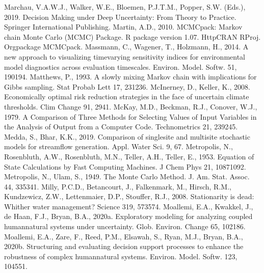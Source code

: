 \documentclass[letterpaper,10pt,english]{sphinxmanual}
\begin{document}
Marchau, V.A.W.J., Walker, W.E., Bloemen, P.J.T.M., Popper, S.W. (Eds.), 2019. Decision Making under Deep Uncertainty: From Theory to Practice. Springer International Publishing. 
Martin, A.D., 2010. MCMCpack: Markov chain Monte Carlo (MCMC) Package. R package version 1.0\sphinxhyphen{}7. HttpCRAN R\sphinxhyphen{}Proj. Orgpackage MCMCpack.
Massmann, C., Wagener, T., Holzmann, H., 2014. A new approach to visualizing time\sphinxhyphen{}varying sensitivity indices for environmental model diagnostics across evaluation time\sphinxhyphen{}scales. Environ. Model. Softw. 51, 190\textendash{}194. 
Matthews, P., 1993. A slowly mixing Markov chain with implications for Gibbs sampling. Stat Probab Lett 17, 231\textendash{}236. 
McInerney, D., Keller, K., 2008. Economically optimal risk reduction strategies in the face of uncertain climate thresholds. Clim Change 91, 29\textendash{}41. 
McKay, M.D., Beckman, R.J., Conover, W.J., 1979. A Comparison of Three Methods for Selecting Values of Input Variables in the Analysis of Output from a Computer Code. Technometrics 21, 239\textendash{}245. 
Medda, S., Bhar, K.K., 2019. Comparison of single\sphinxhyphen{}site and multi\sphinxhyphen{}site stochastic models for streamflow generation. Appl. Water Sci. 9, 67.
Metropolis, N., Rosenbluth, A.W., Rosenbluth, M.N., Teller, A.H., Teller, E., 1953. Equation of State Calculations by Fast Computing Machines. J Chem Phys 21, 1087\textendash{}1092. 
Metropolis, N., Ulam, S., 1949. The Monte Carlo Method. J. Am. Stat. Assoc. 44, 335\textendash{}341. 
Milly, P.C.D., Betancourt, J., Falkenmark, M., Hirsch, R.M., Kundzewicz, Z.W., Lettenmaier, D.P., Stouffer, R.J., 2008. Stationarity is dead: Whither water management? Science 319, 573\textendash{}574. 
Moallemi, E.A., Kwakkel, J., de Haan, F.J., Bryan, B.A., 2020a. Exploratory modeling for analyzing coupled human\sphinxhyphen{}natural systems under uncertainty. Glob. Environ. Change 65, 102186. 
Moallemi, E.A., Zare, F., Reed, P.M., Elsawah, S., Ryan, M.J., Bryan, B.A., 2020b. Structuring and evaluating decision support processes to enhance the robustness of complex human\textendash{}natural systems. Environ. Model. Softw. 123, 104551. 
\end{document}
